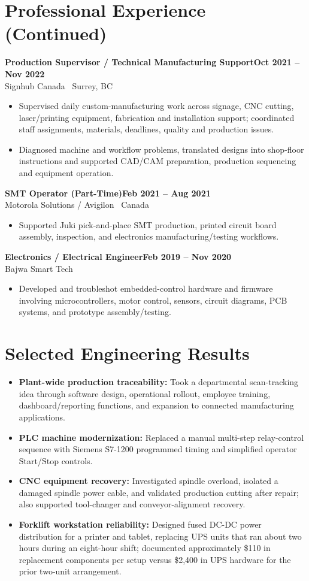 \documentclass[10pt,letterpaper]{article}
\newcommand{\job}[3]{\vspace{3pt}\textbf{#1}\hfill\textbf{#2}\\[-1pt]{\color{muted}#3}\vspace{1pt}}
\begin{document}
\section{Professional Experience (Continued)}
\job{Production Supervisor / Technical Manufacturing Support}{Oct 2021 -- Nov 2022}{Signhub Canada \textbar\ Surrey, BC}
\begin{itemize}
\item Supervised daily custom-manufacturing work across signage, CNC cutting, laser/printing equipment, fabrication and installation support; coordinated staff assignments, materials, deadlines, quality and production issues.
\item Diagnosed machine and workflow problems, translated designs into shop-floor instructions and supported CAD/CAM preparation, production sequencing and equipment operation.
\end{itemize}
\job{SMT Operator (Part-Time)}{Feb 2021 -- Aug 2021}{Motorola Solutions / Avigilon \textbar\ Canada}
\begin{itemize}
\item Supported Juki pick-and-place SMT production, printed circuit board assembly, inspection, and electronics manufacturing/testing workflows.
\end{itemize}
\job{Electronics / Electrical Engineer}{Feb 2019 -- Nov 2020}{Bajwa Smart Tech}
\begin{itemize}
\item Developed and troubleshot embedded-control hardware and firmware involving microcontrollers, motor control, sensors, circuit diagrams, PCB systems, and prototype assembly/testing.
\end{itemize}
\section{Selected Engineering Results}
\begin{itemize}
\item \textbf{Plant-wide production traceability:} Took a departmental scan-tracking idea through software design, operational rollout, employee training, dashboard/reporting functions, and expansion to connected manufacturing applications.
\item \textbf{PLC machine modernization:} Replaced a manual multi-step relay-control sequence with Siemens S7-1200 programmed timing and simplified operator Start/Stop controls.
\item \textbf{CNC equipment recovery:} Investigated spindle overload, isolated a damaged spindle power cable, and validated production cutting after repair; also supported tool-changer and conveyor-alignment recovery.
\item \textbf{Forklift workstation reliability:} Designed fused DC-DC power distribution for a printer and tablet, replacing UPS units that ran about two hours during an eight-hour shift; documented approximately \$110 in replacement components per setup versus \$2,400 in UPS hardware for the prior two-unit arrangement.
\end{itemize}
\end{document}
